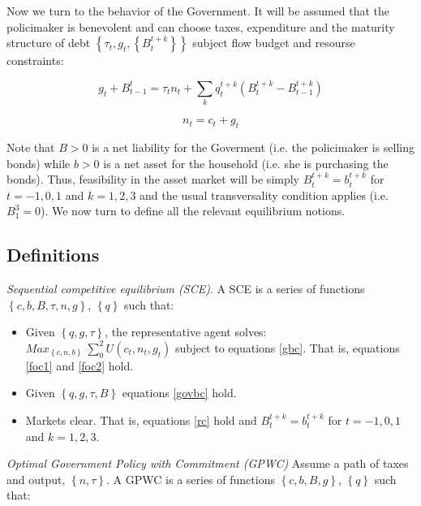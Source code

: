 \documentclass[11pt,letterpaper]{article}
\let\oldsum\sum
\renewcommand{\sum}{\displaystyle\oldsum} %
\begin{document}
\bigskip
Now we turn to the behavior of the Government. It will be assumed that the policimaker is benevolent and can choose taxes, expenditure and the maturity structure of debt $\left\{ \tau_t,g_t,\left\{ B_t^{t+k} \right\} \right\}$ subject flow budget and resourse constraints:

\bigskip

\begin{equation}
\label{govbc}
g_t+B_{t-1}^{t}= \tau_tn_t+\sum_k q_t^{t+k}(B_t^{t+k}-B_{t-1}^{t+k})
\end{equation}

\begin{equation}
\label{rc}
n_t=c_t+g_t
\end{equation}

\bigskip

Note that $B>0$ is a net liability for the Goverment (i.e. the policimaker is selling bonds) while $b>0$ is a net asset for the household (i.e. she is purchasing the bonds). Thus, feasibility in the asset market will be simply $B_t^{t+k}=b_t^{t+k}$ for $t=-1,0,1$ and $k=1,2,3$ and the usual transversality condition applies (i.e. $B_1^{3}=0$). We now turn to define all the relevant equilibrium notions.

\bigskip

\subsection*{Definitions}

\bigskip

\textit{Sequential competitive equilibrium (SCE)}. A SCE is a series of functions $\left\{ c,b,B,\tau,n,g \right\}$, $\left\{ q \right\}$ such that:

\bigskip

\begin{itemize}
  \item Given $\left\{ q,g, \tau \right\}$, the representative agent solves: $Max_{\left\{ c,n,b \right\}} \ \sum_{0}^{2}U(c_t,n_t,g_t)$ subject to equations \eqref{gbc}. That is, equations \eqref{foc1} and \eqref{foc2} hold.
  \item Given $\left\{ q,g, \tau, B \right\}$ equations  \eqref{govbc} hold.
  \item Markets clear. That is, equations  \eqref{rc} hold and $B_t^{t+k}=b_t^{t+k}$ for $t=-1,0,1$ and $k=1,2,3$.
\end{itemize}

\bigskip

\textit{Optimal Government Policy with Commitment (GPWC)} Assume a path of taxes and output, $\left\{ n,\tau \right\}$. A GPWC  is a series of functions $\left\{ c,b,B,g \right\}$, $\left\{ q \right\}$ such that:
\end{document}
